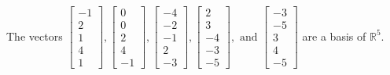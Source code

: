 \begin{exercise}
\begin{exerciseStatement}
  \end{exerciseStatement}
  \begin{exerciseAnswer}
   The vectors \(\left[\begin{array}{r}
-1 \\
2 \\
1 \\
4 \\
1
\end{array}\right] , \left[\begin{array}{r}
0 \\
0 \\
2 \\
4 \\
-1
\end{array}\right] , \left[\begin{array}{r}
-4 \\
-2 \\
-1 \\
2 \\
-3
\end{array}\right] , \left[\begin{array}{r}
2 \\
3 \\
-4 \\
-3 \\
-5
\end{array}\right] , \text{ and } \left[\begin{array}{r}
-3 \\
-5 \\
3 \\
4 \\
-5
\end{array}\right]\) 
  	 are  a basis of \(\mathbb{R}^5\).
  


  \end{exerciseAnswer}
\end{exercise}